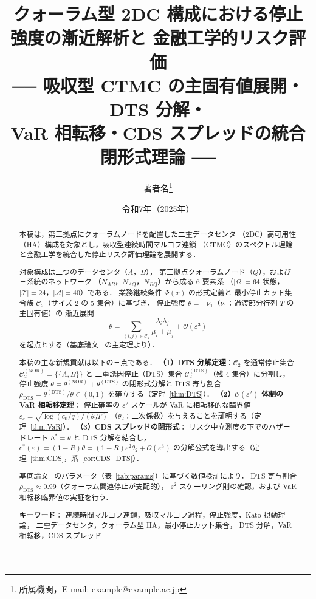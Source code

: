 \documentclass[12pt,a4paper]{article}
\title{%
  \textbf{クォーラム型 2DC 構成における停止強度の漸近解析と
  金融工学的リスク評価}\\[0.5em]
  \large
  ── 吸収型 CTMC の主固有値展開・DTS 分解・\\
  VaR 相転移・CDS スプレッドの統合閉形式理論 ──
}
\author{著者名\thanks{所属機関，E-mail: example@example.ac.jp}}
\date{令和7年（2025年）}
\theoremstyle{plain}
\theoremstyle{definition}
\theoremstyle{remark}
\newcommand{\calO}{\mathcal{O}}        %
\newcommand{\calA}{\mathcal{A}}        %
\newcommand{\calT}{\mathcal{T}}        %
\newcommand{\eps}{\varepsilon}         %
\newcommand{\calCtwo}{\mathcal{C}_2}   %
\newcommand{\calCNOR}{\calCtwo^{(\mathrm{NOR})}}
\newcommand{\calCDTS}{\calCtwo^{(\mathrm{DTS})}}
\newcommand{\thetaNOR}{\theta^{(\mathrm{NOR})}}
\newcommand{\thetaDTS}{\theta^{(\mathrm{DTS})}}
\newcommand{\rhoDTS}{\rho_{\mathrm{DTS}}}
\begin{document}
\sloppy
\setlength{\emergencystretch}{4em}
\maketitle\thispagestyle{empty}

\begin{abstract}
本稿は，第三拠点にクォーラムノードを配置した二重データセンタ
（2DC）高可用性（HA）構成を対象とし，吸収型連続時間マルコフ連鎖
（CTMC）のスペクトル理論と金融工学を統合した停止リスク評価理論を展開する．

対象構成は二つのデータセンタ（$A$，$B$），
第三拠点クォーラムノード（$Q$），および三系統のネットワーク
（$N_{AB}$，$N_{AQ}$，$N_{BQ}$）から成る 6 要素系
（$|\Omega|=64$ 状態，$|\calT|=24$，$|\calA|=40$）である．
業務継続条件 $\Phi(x)$ の形式定義と
最小停止カット集合族 $\calCtwo$（サイズ 2 の 5 集合）に基づき，
停止強度 $\theta = -\nu_1$（$\nu_1$：過渡部分行列 $T$ の主固有値）の
漸近展開
\[
  \theta = \sum_{(i,j)\in\calCtwo}\frac{\lambda_i\lambda_j}{\mu_i+\mu_j}
  + \calO(\eps^3)
\]
を起点とする（基底論文~\cite{habase:v7} の主定理より）．

本稿の主な新規貢献は以下の三点である．
\textbf{（1）DTS 分解定理}：$\calCtwo$ を通常停止集合 $\calCNOR = \{\{A,B\}\}$ と
二重誘因停止（DTS）集合 $\calCDTS$（残 4 集合）に分割し，
停止強度 $\theta = \thetaNOR + \thetaDTS$ の閉形式分解と
DTS 寄与割合 $\rhoDTS = \thetaDTS/\theta \in (0,1)$ を確立する（定理~\ref{thm:DTS}）．
\textbf{（2）$\calO(\eps^2)$ 体制の VaR 相転移定理}：
停止確率の $\eps^2$ スケールが VaR に相転移的な臨界値
$\eps_c = \sqrt{\log(c_0/q)/(\theta_2 T)}$
（$\theta_2$：二次係数）を与えることを証明する（定理~\ref{thm:VaR}）．
\textbf{（3）CDS スプレッドの閉形式}：
リスク中立測度の下でのハザードレート $h^*=\theta$ と
DTS 分解を結合し，
$c^*(\eps) = (1{-}R)\theta = (1{-}R)\eps^2\theta_2 + \calO(\eps^3)$
の分解公式を導出する（定理~\ref{thm:CDS}，系~\ref{cor:CDS_DTS}）．

基底論文~\cite{habase:v7} のパラメータ（表~\ref{tab:params}）に基づく数値検証により，
DTS 寄与割合 $\rhoDTS \approx 0.99$（クォーラム関連停止が支配的），
$\eps^2$ スケーリング則の確認，および VaR 相転移臨界値の実証を行う．

\medskip
\noindent\textbf{キーワード}：
連続時間マルコフ連鎖，吸収マルコフ過程，停止強度，Kato 摂動理論，
二重データセンタ，クォーラム型 HA，最小停止カット集合，
DTS 分解，VaR 相転移，CDS スプレッド
\end{abstract}
\end{document}
